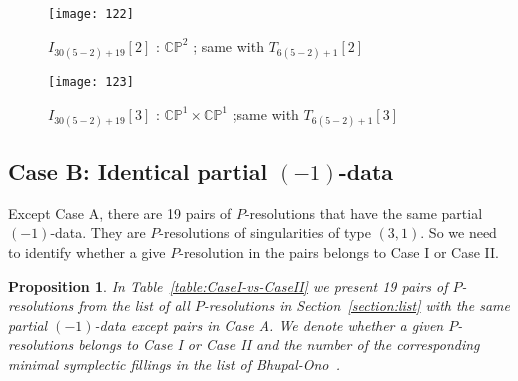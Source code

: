 \documentclass[reqno, twoside, a4paper]{amsart}
\newtheorem{proposition}[theorem]{Proposition}
\theoremstyle{definition}
\numberwithin{equation}{section}
\begin{document}
\begin{figure}[H]
  \centering
  \texttt{[image: 122]}
  \caption{$I_{30(5-2)+19}[2]$ : $\mathbb{CP}^2$ ; same with $T_{6(5-2)+1}[2]$}
\end{figure}

\begin{figure}[H]
  \centering
  \texttt{[image: 123]}
  \caption{$I_{30(5-2)+19}[3]$ : $\mathbb{CP}^1 \times \mathbb{CP}^1$ ;same with $T_{6(5-2)+1}[3]$}
  \label{figure:CP2-vs-CP1*CP1-end}
\end{figure}






\subsection{Case B: Identical partial $(-1)$-data}

Except Case A, there are 19 pairs of $P$-resolutions that have the same partial $(-1)$-data. They are $P$-resolutions of singularities of type $(3,1)$. So we need to identify whether a give $P$-resolution in the pairs belongs to Case I or Case II.

\begin{proposition}
In Table~\ref{table:CaseI-vs-CaseII} we present 19 pairs of $P$-resolutions from the list of all $P$-resolutions in Section~\ref{section:list} with the same partial $(-1)$-data except pairs in Case A. We denote whether a given $P$-resolutions belongs to Case I or Case II and the number of the corresponding minimal symplectic fillings in the list of Bhupal-Ono~\cite[\S5]{Bhupal-Ono-2012}.
\end{proposition}
\end{document}
